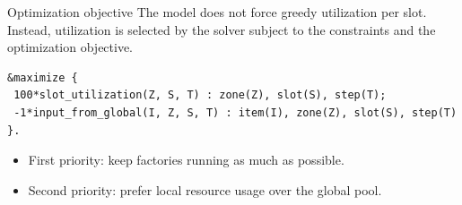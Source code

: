 \documentclass[aspectratio=169]{beamer}
\begin{document}
\begin{frame}[fragile]{Optimization objective}
The model does not force greedy utilization per slot. Instead, utilization is selected by the solver subject to the constraints and the optimization objective.

\vspace{0.6em}
\begin{lstlisting}[language=asp]
% want factories to run as much as possible, consume local resources first
&maximize {
 100*slot_utilization(Z, S, T) : zone(Z), slot(S), step(T);
 -1*input_from_global(I, Z, S, T) : item(I), zone(Z), slot(S), step(T)
}.
\end{lstlisting}

\vspace{0.6em}
\begin{itemize}
    \item First priority: keep factories running as much as possible.
    \item Second priority: prefer local resource usage over the global pool.
\end{itemize}
\end{frame}
\end{document}
